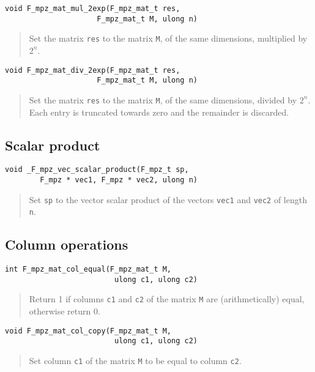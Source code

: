 \documentclass[a4paper,10pt]{article}
\newcommand{\code}{\lstinline}
\begin{document}
\begin{lstlisting}
void F_mpz_mat_mul_2exp(F_mpz_mat_t res, 
                     F_mpz_mat_t M, ulong n)
\end{lstlisting}
\begin{quote}
Set the matrix \code{res} to the matrix \code{M}, of the same dimensions, multiplied by $2^n$. 
\end{quote}

\begin{lstlisting}
void F_mpz_mat_div_2exp(F_mpz_mat_t res, 
                     F_mpz_mat_t M, ulong n)
\end{lstlisting}
\begin{quote}
Set the matrix \code{res} to the matrix \code{M}, of the same dimensions, divided by $2^n$. Each entry
is truncated towards zero and the remainder is discarded.
\end{quote}

\subsection{Scalar product}

\begin{lstlisting}
void _F_mpz_vec_scalar_product(F_mpz_t sp, 
        F_mpz * vec1, F_mpz * vec2, ulong n)
\end{lstlisting}
\begin{quote}
Set \code{sp} to the vector scalar product of the vectors \code{vec1} and \code{vec2} of length \code{n}.
\end{quote}

\subsection{Column operations}

\begin{lstlisting}
int F_mpz_mat_col_equal(F_mpz_mat_t M, 
                         ulong c1, ulong c2)
\end{lstlisting}
\begin{quote}
Return 1 if columns \code{c1} and \code{c2} of the matrix \code{M} are (arithmetically) equal, otherwise
return 0.
\end{quote}

\begin{lstlisting}
void F_mpz_mat_col_copy(F_mpz_mat_t M, 
                         ulong c1, ulong c2)
\end{lstlisting}
\begin{quote}
Set column \code{c1} of the matrix \code{M} to be equal to column \code{c2}.
\end{quote}
\end{document}
